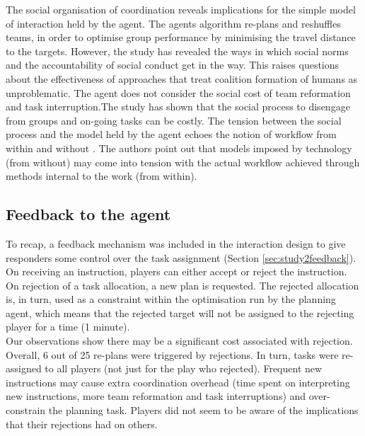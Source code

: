 The social organisation of coordination reveals implications for the simple model of interaction held by the agent. The agents algorithm re-plans and reshuffles teams, in order to optimise group performance by minimising the travel distance to the targets. However, the study has revealed the ways in which social norms and the accountability of social conduct get in the way. This raises questions about the effectiveness of approaches that treat coalition formation of humans as unproblematic. The agent does not consider the social cost of team reformation and task interruption.The study has shown that the social process to disengage from groups and on-going tasks can be costly. The tension between the social process and the model held by the agent echoes the notion of workflow from within and without \citep{Bowers1994}. The authors point out that models imposed by technology (from without) may come into tension with the actual workflow achieved through methods internal to the work (from within). 



\subsection{Feedback to the agent}\label{sec:studytwofeedback}

To recap, a feedback mechanism was included in the interaction design to give responders some control over the task assignment (Section \ref{sec:study2feedback}). On receiving an instruction, players can either accept or reject the instruction. On rejection of a task allocation, a new plan is requested. The rejected allocation is, in turn, used as a constraint within the optimisation run by the planning agent, which means that the rejected target will not be assigned to the rejecting player for a time (1 minute). \\

Our observations show there may be a significant cost associated with rejection. Overall, 6 out of 25 re-plans were triggered by rejections. In turn, tasks were re-assigned to all players (not just for the play who rejected). Frequent new instructions may cause extra coordination overhead (time spent on interpreting new instructions, more team reformation and task interruptions) and over-constrain the planning task. Players did not seem to be aware of the implications that their rejections had on others.\\
 
